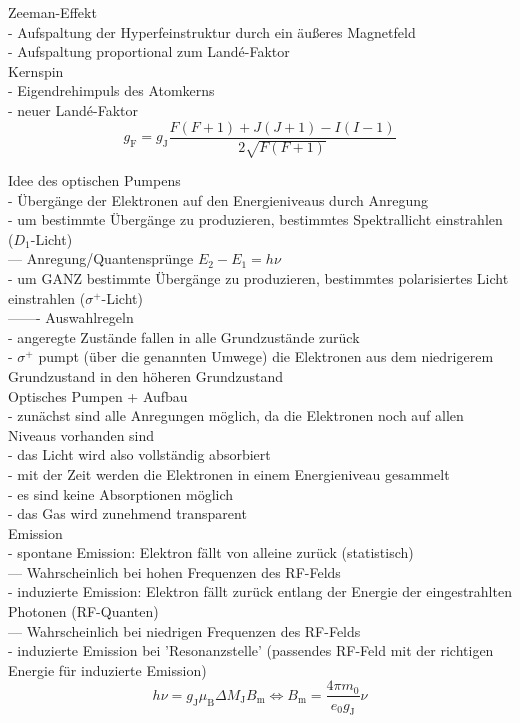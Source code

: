 Zeeman-Effekt\\
- Aufspaltung der Hyperfeinstruktur durch ein äußeres Magnetfeld\\
- Aufspaltung proportional zum Landé-Faktor\\

Kernspin\\
- Eigendrehimpuls des Atomkerns\\
- neuer Landé-Faktor\\
\begin{equation}
  g_{\text{F}}= g_{\text{J}} \frac{ F\left(F+1\right) + J\left(J+1\right) - I\left(I-1\right)  }{2 \sqrt{F\left(F+1\right)}}
\label{eqn:landef}
\end{equation}

Idee des optischen Pumpens\\
- Übergänge der Elektronen auf den Energieniveaus durch Anregung\\
- um bestimmte Übergänge zu produzieren, bestimmtes Spektrallicht einstrahlen ($D_{1}$-Licht)\\
  --- Anregung/Quantensprünge $E_{2}-E_{1}=h \nu$\\
- um GANZ bestimmte Übergänge zu produzieren, bestimmtes polarisiertes Licht einstrahlen ($\sigma^{+}$-Licht)\\
  ——- Auswahlregeln\\
- angeregte Zustände fallen in alle Grundzustände zurück\\
- $\sigma^{+}$ pumpt (über die genannten Umwege) die Elektronen aus dem niedrigerem Grundzustand in den höheren Grundzustand\\

Optisches Pumpen + Aufbau\\
- zunächst sind alle Anregungen möglich, da die Elektronen noch auf allen Niveaus vorhanden sind\\
- das Licht wird also vollständig absorbiert\\
- mit der Zeit werden die Elektronen in einem Energieniveau gesammelt\\
- es sind keine Absorptionen möglich\\
- das Gas wird zunehmend transparent\\

Emission\\
- spontane Emission: Elektron fällt von alleine zurück (statistisch)\\
  --- Wahrscheinlich bei hohen Frequenzen des RF-Felds\\
- induzierte Emission: Elektron fällt zurück entlang der Energie der eingestrahlten Photonen (RF-Quanten)\\
  --- Wahrscheinlich bei niedrigen Frequenzen des RF-Felds\\
- induzierte Emission bei 'Resonanzstelle' (passendes RF-Feld mit der richtigen Energie für induzierte Emission)\\
\begin{equation}
  h \nu = g_{\text{J}} \mu_{\text{B}} \Delta M_{\text{J}} B_{\text{m}} \Leftrightarrow B_{\text{m}} = \frac{4 \pi m_{0}}{e_{0} g_{\text{J}}} \nu
\label{eqn:resonanz}
\end{equation}

